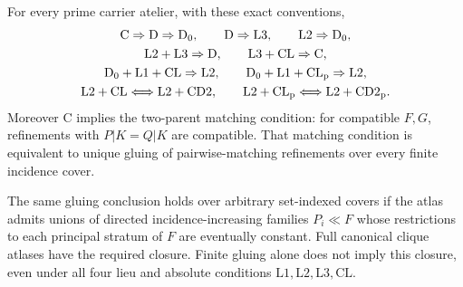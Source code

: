 \begin{theorem}\label{thm:criteria}
For every prime carrier atelier, with these exact conventions,
\[
\begin{gathered}
 \mathrm C\Rightarrow\mathrm D\Rightarrow\mathrm D_0,
 \qquad \mathrm D\Rightarrow\mathrm L3,
 \qquad \mathrm L2\Rightarrow\mathrm D_0,\\
 \mathrm L2+\mathrm L3\Rightarrow\mathrm D,
 \qquad \mathrm L3+\mathrm{CL}\Rightarrow\mathrm C,\\
 \mathrm D_0+\mathrm L1+\mathrm{CL}\Rightarrow\mathrm L2,
 \qquad \mathrm D_0+\mathrm L1+\mathrm{CL}_{\rm p}\Rightarrow\mathrm L2,\\
 \mathrm L2+\mathrm{CL}\Longleftrightarrow\mathrm L2+\mathrm{CD2},
 \qquad
 \mathrm L2+\mathrm{CL}_{\rm p}\Longleftrightarrow
                  \mathrm L2+\mathrm{CD2}_{\rm p}.
\end{gathered}
\]
Moreover $\mathrm C$ implies the two-parent matching condition:
for compatible $F,G$, refinements with $P|K=Q|K$ are compatible.
That matching condition is equivalent to unique gluing of
pairwise-matching refinements over every finite incidence cover.

The same gluing conclusion holds over arbitrary set-indexed covers
if the atlas admits unions of directed incidence-increasing
families $P_i\ll F$ whose restrictions to each principal stratum
of $F$ are eventually constant. Full canonical clique atlases
have the required closure. Finite gluing alone does not imply
this closure, even under all four lieu and absolute conditions
$\mathrm L1,\mathrm L2,\mathrm L3,\mathrm{CL}$.
\end{theorem}

